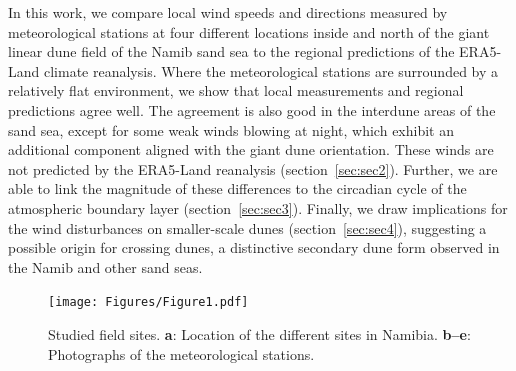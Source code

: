 In this work, we compare local wind speeds and directions measured by meteorological stations at four different locations inside and north of the giant linear dune field of the Namib sand sea to the regional predictions of the ERA5-Land climate reanalysis. Where the meteorological stations are surrounded by a relatively flat environment, we show that local measurements and regional predictions agree well. The agreement is also good in the interdune areas of the sand sea, except for some weak winds blowing at night, which exhibit an additional component aligned with the giant dune orientation. These winds are not predicted by the ERA5-Land reanalysis (section~\ref{sec:sec2}). Further, we are able to link the magnitude of these differences to the circadian cycle of the atmospheric boundary layer (section~\ref{sec:sec3}). Finally, we draw implications for the wind disturbances on smaller-scale dunes (section~\ref{sec:sec4}), suggesting a possible origin for crossing dunes, a distinctive secondary dune form observed in the Namib and other sand seas.


\begin{figure}[t]
  \centering
  \texttt{[image: Figures/Figure1.pdf]}
  \caption{Studied field sites. \textbf{a}: Location of the different sites in Namibia. \textbf{b--e}: Photographs of the meteorological stations.}
  \label{Fig1}
\end{figure}

